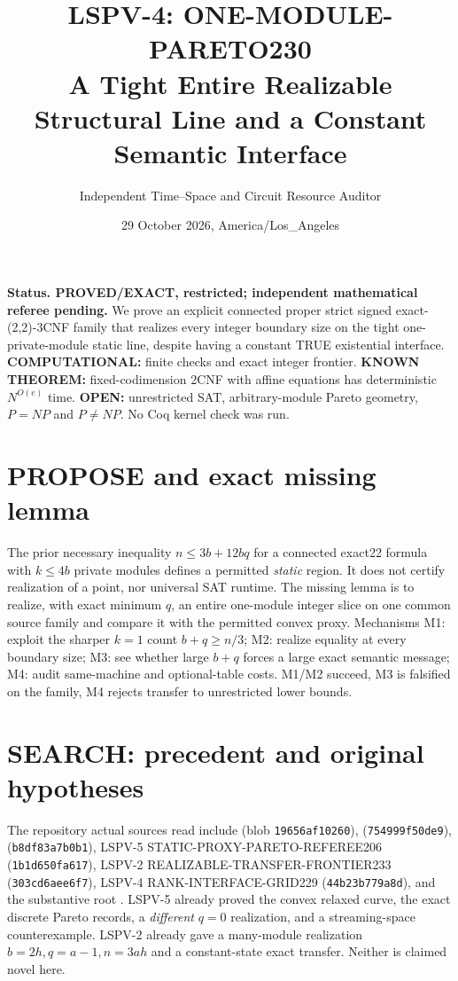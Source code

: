\documentclass[11pt]{article}
\title{LSPV-4: ONE-MODULE-PARETO230\\A Tight Entire Realizable Structural Line and a Constant Semantic Interface}
\author{Independent Time--Space and Circuit Resource Auditor}
\date{29 October 2026, America/Los\_Angeles}
\begin{document}
\maketitle
\noindent\textbf{Status. PROVED/EXACT, restricted; independent mathematical referee pending.} We prove an explicit connected proper strict signed exact-(2,2)-3CNF family that realizes every integer boundary size on the tight one-private-module static line, despite having a constant TRUE existential interface. \textbf{COMPUTATIONAL:} finite checks and exact integer frontier. \textbf{KNOWN THEOREM:} fixed-codimension 2CNF with affine equations has deterministic $N^{O(e)}$ time. \textbf{OPEN:} unrestricted SAT, arbitrary-module Pareto geometry, $P=NP$ and $P\ne NP$. No Coq kernel check was run.

\section{PROPOSE and exact missing lemma}
The prior necessary inequality $n\le3b+12bq$ for a connected exact22 formula with $k\le4b$ private modules defines a permitted \emph{static} region. It does not certify realization of a point, nor universal SAT runtime. The missing lemma is to realize, with exact minimum $q$, an entire one-module integer slice on one common source family and compare it with the permitted convex proxy. Mechanisms M1: exploit the sharper $k=1$ count $b+q\ge n/3$; M2: realize equality at every boundary size; M3: see whether large $b+q$ forces a large exact semantic message; M4: audit same-machine and optional-table costs. M1/M2 succeed, M3 is falsified on the family, M4 rejects transfer to unrestricted lower bounds.

\section{SEARCH: precedent and original hypotheses}
The repository actual sources read include  (blob \texttt{19656af10260}),  (\texttt{754999f50de9}),  (\texttt{b8df83a7b0b1}), LSPV-5 STATIC-PROXY-PARETO-REFEREE206 (\texttt{1b1d650fa617}), LSPV-2 REALIZABLE-TRANSFER-FRONTIER233 (\texttt{303cd6aee6f7}), LSPV-4 RANK-INTERFACE-GRID229 (\texttt{44b23b779a8d}), and the substantive root . LSPV-5 already proved the convex relaxed curve, the exact discrete Pareto records, a \emph{different} $q=0$ realization, and a streaming-space counterexample. LSPV-2 already gave a many-module realization $b=2h,q=a-1,n=3ah$ and a constant-state exact transfer. Neither is claimed novel here.
\end{document}
